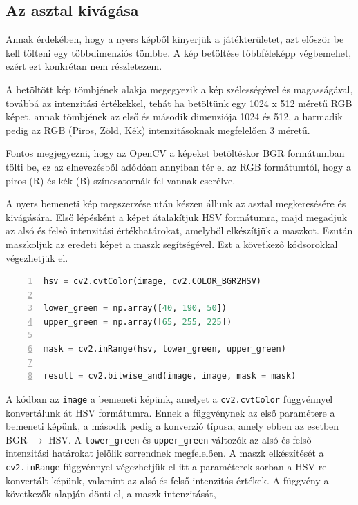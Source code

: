 \subsection{Az asztal kivágása}
Annak érdekében, hogy a nyers képből kinyerjük a játékterületet, azt először be kell tölteni egy többdimenziós tömbbe. A kép betöltése többféleképp végbemehet, ezért ezt konkrétan nem részletezem.
\par A betöltött kép tömbjének alakja megegyezik a kép szélességével és magasságával, továbbá az intenzitási értékekkel, tehát ha betöltünk egy 1024 x 512 méretű RGB képet, annak tömbjének az első és második dimenziója 1024 és 512, a harmadik pedig az RGB (Piros, Zöld, Kék) intenzitásoknak megfelelően 3 méretű.
\par Fontos megjegyezni, hogy az OpenCV a képeket betöltéskor BGR formátumban tölti be, ez az elnevezésből adódóan annyiban tér el az RGB formátumtól, hogy a piros (R) és kék (B) színcsatornák fel vannak cserélve.
\par A nyers bemeneti kép megszerzése után készen állunk az asztal megkeresésére és kivágására. Első lépésként a képet átalakítjuk HSV formátumra, majd megadjuk az alsó és felső intenzitási értékhatárokat, amelyből elkészítjük a maszkot. Ezután maszkoljuk az eredeti képet a maszk segítségével.
\newline Ezt a következő kódsorokkal végezhetjük el.


\vspace{2mm}\begin{lstlisting}[language=Python, numbers=left]
hsv = cv2.cvtColor(image, cv2.COLOR_BGR2HSV)

lower_green = np.array([40, 190, 50])
upper_green = np.array([65, 255, 225])

mask = cv2.inRange(hsv, lower_green, upper_green)

result = cv2.bitwise_and(image, image, mask = mask)
\end{lstlisting}

\par A kódban az \lstinline{image} a bemeneti képünk, amelyet a \lstinline{cv2.cvtColor} függvénnyel \cite{cv2_cvt_color} konvertálunk át HSV formátumra. Ennek a függvénynek az első paramétere a bemeneti képünk, a második pedig a konverzió típusa, amely ebben az esetben BGR $\rightarrow$ HSV. A \lstinline{lower_green} és \lstinline{upper_green} változók az alsó és felső intenzitási határokat jelölik sorrendnek megfelelően. A maszk elkészítését a \lstinline{cv2.inRange} függvénnyel \cite{cv2_in_range} végezhetjük el itt a paraméterek sorban a HSV re konvertált képünk, valamint az alsó és felső intenzitás értékek.
\newline A függvény a következők alapján dönti el, a maszk intenzitását,

